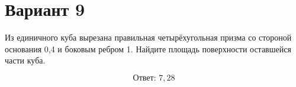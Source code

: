 \documentclass[12pt,a4paper]{article}
\begin{document}
\section*{Вариант 9}

Из единичного куба вырезана правильная четырёхугольная призма со стороной основания 0{,}4 и боковым ребром 1. Найдите площадь поверхности оставшейся части куба.

\begin{center}
\end{center}

\[
\boxed{\text{Ответ: }7{,}28}
\]
\end{document}
